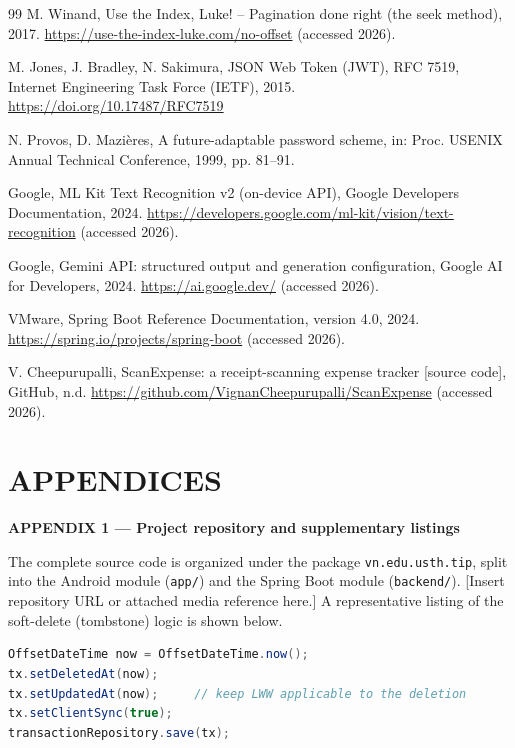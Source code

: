 \documentclass[13pt,a4paper]{extarticle}
\begin{document}
\begin{thebibliography}{99}
 M. Winand, Use the Index, Luke! -- Pagination done right (the seek method), 2017. \url{https://use-the-index-luke.com/no-offset} (accessed 2026).

 M. Jones, J. Bradley, N. Sakimura, JSON Web Token (JWT), RFC 7519, Internet Engineering Task Force (IETF), 2015. \url{https://doi.org/10.17487/RFC7519}

 N. Provos, D. Mazi\`eres, A future-adaptable password scheme, in: Proc. USENIX Annual Technical Conference, 1999, pp. 81--91.

 Google, ML Kit Text Recognition v2 (on-device API), Google Developers Documentation, 2024. \url{https://developers.google.com/ml-kit/vision/text-recognition} (accessed 2026).

 Google, Gemini API: structured output and generation configuration, Google AI for Developers, 2024. \url{https://ai.google.dev/} (accessed 2026).

 VMware, Spring Boot Reference Documentation, version 4.0, 2024. \url{https://spring.io/projects/spring-boot} (accessed 2026).

 V. Cheepurupalli, ScanExpense: a receipt-scanning expense tracker [source code], GitHub, n.d. \url{https://github.com/VignanCheepurupalli/ScanExpense} (accessed 2026).

\end{thebibliography}

\clearpage
\section*{APPENDICES}

\begin{center}\textbf{APPENDIX 1 --- Project repository and supplementary listings}\end{center}
The complete source code is organized under the package \texttt{vn.edu.usth.tip}, split into the
Android module (\texttt{app/}) and the Spring Boot module (\texttt{backend/}).
[Insert repository URL or attached media reference here.] A representative listing of the soft-delete
(tombstone) logic is shown below.

\begin{lstlisting}[language=Java,caption={Soft delete marks the row and stamps a new timestamp so LWW still applies.}]
OffsetDateTime now = OffsetDateTime.now();
tx.setDeletedAt(now);
tx.setUpdatedAt(now);     // keep LWW applicable to the deletion
tx.setClientSync(true);
transactionRepository.save(tx);
\end{lstlisting}
\end{document}
